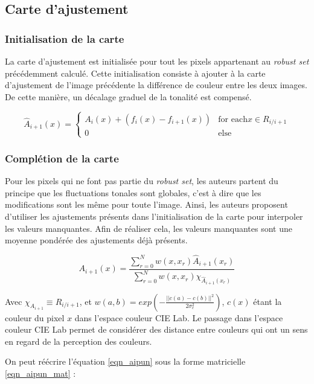 \subsection{Carte d'ajustement}
\subsubsection*{Initialisation de la carte}
La carte d'ajustement est initialisée pour tout les pixels appartenant au \textit{robust set} précédemment calculé. Cette initialisation consiste à ajouter à la carte d'ajustement de l'image précédente la différence de couleur entre les deux images. De cette manière, un décalage graduel de la tonalité est compensé.

\begin{equation}
\hat{A}_{i+1}(x) = 
\begin{cases}
A_{i}(x) + (f_{i}(x) - f_{i+1}(x)) & \text{for each} x \in R_{i/i+1}\\
0 & \text{else}
\end{cases}
\end{equation}

\subsubsection*{Complétion de la carte}

Pour les pixels qui ne font pas partie du \textit{robust set}, les auteurs partent du principe que les fluctuations tonales sont globales, c'est à dire que les modifications sont les même pour toute l'image.
Ainsi, les auteurs proposent d'utiliser les ajustements présents dans l'initialisation de la carte pour interpoler les valeurs manquantes. Afin de réaliser cela, les valeurs manquantes sont une moyenne pondérée des ajustements déjà présents.

\begin{equation}
A_{i+1}(x) = \frac{\sum_{r=0}^{N}{w(x,x_{r})\hat{A}_{i+1}(x_{r})}}{\sum_{r=0}^{N}{w(x,x_{r})\chi_{\hat{A}_{i+1}(x_{r})}}}
\label{eqn_aipun}
\end{equation}

Avec $\chi_{A_{i+1}} \equiv R_{i/i+1}$, et $w(a,b) = exp(-\frac{||c(a)-c(b)||^2}{2\sigma_{c}^{2}})$, $c(x)$ étant la couleur du pixel $x$ dans l'espace couleur CIE Lab. Le passage dans l'espace couleur CIE Lab permet de considérer des distance entre couleurs qui ont un sens en regard de la perception des couleurs.

On peut réécrire l'équation \ref{eqn_aipun} sous la forme matricielle \ref{eqn_aipun_mat} :

